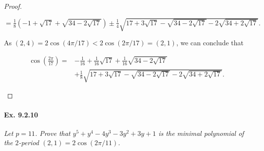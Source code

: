 \documentclass[11pt,a4paper]{article}
\begin{document}
\begin{proof}
\begin{enumerate}
$=\frac{1}{8} \left(-1+\sqrt{17} +\sqrt{34-2\sqrt{17}}\right) \pm \frac{1}{4} \sqrt{17 + 3\sqrt{17} - \sqrt{34-2\sqrt{17}}  -2 \sqrt{34+2\sqrt{17}} }.$

As $(2,4) = 2\cos(4\pi/17) < 2 \cos(2\pi/17) = (2,1)$, we can conclude that

 \begin{align*}
\cos\left(\frac{2\pi}{17}\right) =&-\frac{1}{16}+ \frac{1}{16}\sqrt{17} +\frac{1}{16}\sqrt{34-2\sqrt{17}}\\
 & + \frac{1}{8} \sqrt{17 + 3\sqrt{17} - \sqrt{34-2\sqrt{17}}  -2 \sqrt{34+2\sqrt{17}} }.
 \end{align*}
 
\end{enumerate}
\end{proof}

\paragraph{Ex. 9.2.10}

{\it Let $p=11$. Prove that $y^5+y^4-4y^3-3y^2+3y+1$ is the minimal polynomial of the $2$-period $(2,1)=2\cos(2\pi/11)$.
}
\end{document}
